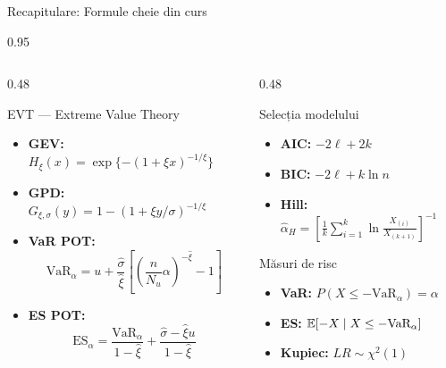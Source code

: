 \documentclass[9pt, aspectratio=169, t]{beamer}
\begin{document}
\begin{frame}{Recapitulare: Formule cheie din curs}
\begin{cminipage}{0.95\textwidth}
\begin{columns}[T]
\begin{column}{0.48\textwidth}
\begin{block}{EVT --- Extreme Value Theory}
\begin{itemize}\setlength{\itemsep}{0pt}
    \item \textbf{GEV:} $H_\xi(x) = \exp\{-(1+\xi x)^{-1/\xi}\}$
    \item \textbf{GPD:} $G_{\xi,\sigma}(y) = 1 - (1+\xi y/\sigma)^{-1/\xi}$
    \item \textbf{VaR POT:}
    $$\text{VaR}_\alpha = u + \frac{\hat{\sigma}}{\hat{\xi}}\left[\left(\frac{n}{N_u}\alpha\right)^{-\hat{\xi}} - 1\right]$$
    \item \textbf{ES POT:}
    $$\text{ES}_\alpha = \frac{\text{VaR}_\alpha}{1-\hat{\xi}} + \frac{\hat{\sigma} - \hat{\xi}u}{1-\hat{\xi}}$$
\end{itemize}
\end{block}
\end{column}
\begin{column}{0.48\textwidth}
\begin{block}{Selecția modelului}
\begin{itemize}\setlength{\itemsep}{0pt}
    \item \textbf{AIC:} $-2\ell + 2k$
    \item \textbf{BIC:} $-2\ell + k\ln n$
    \item \textbf{Hill:} $\hat{\alpha}_H = \left[\frac{1}{k}\sum_{i=1}^k \ln\frac{X_{(i)}}{X_{(k+1)}}\right]^{-1}$
\end{itemize}
\end{block}
\begin{alertblock}{Măsuri de risc}
\begin{itemize}\setlength{\itemsep}{0pt}
    \item \textbf{VaR:} $P(X \leq -\text{VaR}_\alpha) = \alpha$
    \item \textbf{ES:} $\mathbb{E}[-X \mid X \leq -\text{VaR}_\alpha]$
    \item \textbf{Kupiec:} $LR \sim \chi^2(1)$
\end{itemize}
\end{alertblock}
\end{column}
\end{columns}
\end{cminipage}
\end{frame}
\end{document}

